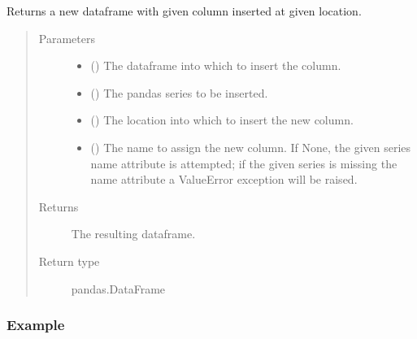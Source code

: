 \documentclass[letterpaper,10pt,english]{sphinxmanual}
\begin{document}
\begin{fulllineitems}
\label{\detokenize{dalio.util:dalio.util.transformation_utils.out_of_place_col_insert}}
Returns a new dataframe with given column inserted at given location.
\begin{quote}\begin{description}
\item[{Parameters}] \leavevmode\begin{itemize}
\item {} 
 () \textendash{} The dataframe into which to insert the column.

\item {} 
 () \textendash{} The pandas series to be inserted.

\item {} 
 () \textendash{} The location into which to insert the new column.

\item {} 
 (\sphinxstyleliteralemphasis{\sphinxupquote{, }}) \textendash{} The name to assign the new column. If None, the given series name
attribute is attempted; if the given series is missing the name
attribute a ValueError exception will be raised.

\end{itemize}

\item[{Returns}] \leavevmode
The resulting dataframe.

\item[{Return type}] \leavevmode
pandas.DataFrame

\end{description}\end{quote}
\subsubsection*{Example}


\end{fulllineitems}
\end{document}
